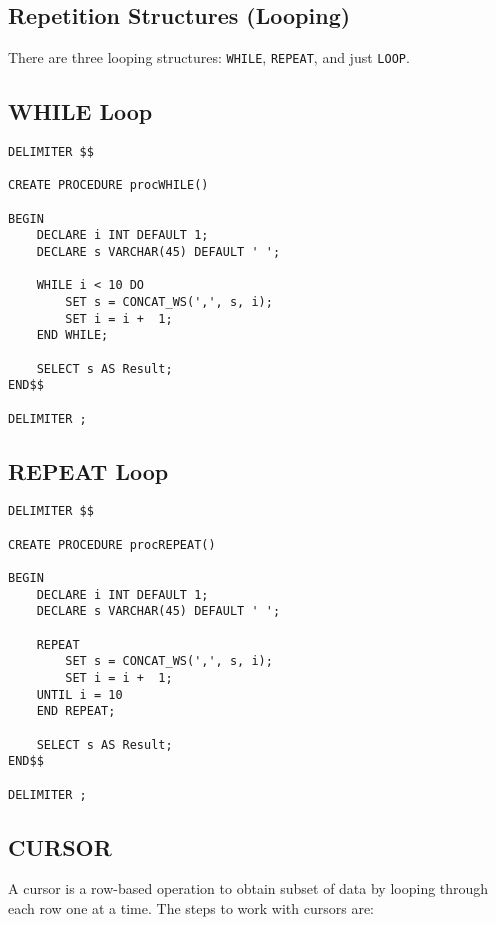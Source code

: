 \documentclass{article}
\begin{document}
  
  
  
  
  
  
\subsection*{Repetition Structures (Looping)}
There are three looping structures: \texttt{WHILE}, \texttt{REPEAT}, and just \texttt{LOOP}.

\subsection*{WHILE Loop}
\begin{lstlisting}[frame=single]  
DELIMITER $$

CREATE PROCEDURE procWHILE()

BEGIN
	DECLARE i INT DEFAULT 1;
	DECLARE s VARCHAR(45) DEFAULT ' ';

	WHILE i < 10 DO
		SET s = CONCAT_WS(',', s, i);
		SET i = i +  1;
	END WHILE;
	
	SELECT s AS Result;
END$$

DELIMITER ;
\end{lstlisting} 







\subsection*{REPEAT Loop}
\begin{lstlisting}[frame=single]  
DELIMITER $$

CREATE PROCEDURE procREPEAT()

BEGIN
	DECLARE i INT DEFAULT 1;
	DECLARE s VARCHAR(45) DEFAULT ' ';

	REPEAT
		SET s = CONCAT_WS(',', s, i);
		SET i = i +  1;
	UNTIL i = 10
	END REPEAT;
	
	SELECT s AS Result;
END$$

DELIMITER ;
\end{lstlisting} 

  
  
  
  
 \subsection*{CURSOR}
 A cursor is a row-based operation to obtain subset of data by looping through each row one at a time.  The steps to work with cursors are:
 
\end{document}
